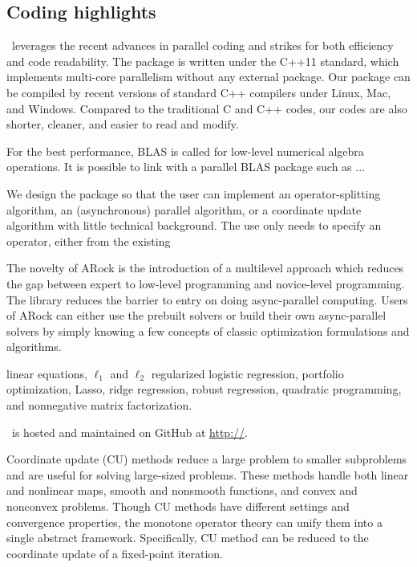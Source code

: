 \subsection{Coding highlights}
\pkg~leverages the recent advances in parallel coding and strikes for both efficiency and code readability. The package is written under the C++11 standard, which implements multi-core parallelism without any external package. Our package can be compiled by  recent versions of standard C++ compilers  under Linux, Mac, and Windows. Compared to the traditional C and C++ codes, our codes  are also shorter, cleaner, and easier to read and modify. 

For the best performance, BLAS is called for low-level numerical algebra operations. It is possible to link with a parallel BLAS package such as ... 

We design the package so that the user can implement an operator-splitting algorithm, an (asynchronous) parallel algorithm, or a coordinate update algorithm  with little technical background. The use only needs to specify an operator, either from the existing 


The novelty of ARock is the introduction of a multilevel approach which reduces the gap between expert to low-level programming and novice-level programming.
The library reduces the barrier to entry on doing async-parallel computing. 
Users of ARock can either use the prebuilt solvers or build their own async-parallel solvers by simply knowing a few concepts of classic optimization formulations and algorithms.
 


linear equations, $\ell_1$ and $\ell_2$ regularized logistic regression, portfolio optimization, 
Lasso, ridge regression, robust regression, quadratic programming, and nonnegative matrix factorization.

\pkg~is hosted and maintained on GitHub at \url{http://}. 



Coordinate update (CU) methods reduce a large problem to smaller subproblems and are useful for solving large-sized problems.
These methods handle both linear and nonlinear maps, smooth and nonsmooth functions, and convex and nonconvex problems. 
Though CU methods have different settings and convergence properties,  the monotone operator theory can unify them into a single abstract framework. 
Specifically, CU method can be reduced to the coordinate update of a fixed-point iteration. 



